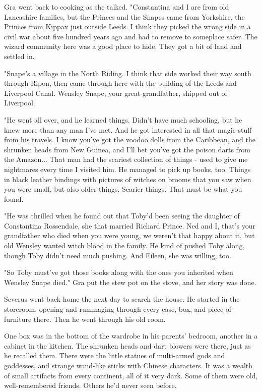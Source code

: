 \documentclass[a4paper,11pt]{article}
\begin{document}
Gra went back to cooking as she talked. "Constantina and I are from old Lancashire families, but the Princes and the Snapes came from Yorkshire, the Princes from Kippax just outside Leeds. I think they picked the wrong side in a civil war about five hundred years ago and had to remove to someplace safer. The wizard community here was a good place to hide. They got a bit of land and settled in.

"Snape's a village in the North Riding. I think that side worked their way south through Ripon, then came through here with the building of the Leeds and Liverpool Canal. Wensley Snape, your great-grandfather, shipped out of Liverpool.

"He went all over, and he learned things. Didn't have much schooling, but he knew more than any man I've met. And he got interested in all that magic stuff from his travels. I know you've got the voodoo dolls from the Caribbean, and the shrunken heads from New Guinea, and I'll bet you've got the poison darts from the Amazon... That man had the scariest collection of things - used to give me nightmares every time I visited him. He managed to pick up books, too. Things in black leather bindings with pictures of witches on brooms that you saw when you were small, but also older things. Scarier things. That must be what you found.

"He was thrilled when he found out that Toby'd been seeing the daughter of Constantina Rossendale, she that married Richard Prince. Ned and I, that's your grandfather who died when you were young, we weren't that happy about it, but old Wensley wanted witch blood in the family. He kind of pushed Toby along, though Toby didn't need much pushing. And Eileen, she was willing, too.

"So Toby must've got those books along with the ones you inherited when Wensley Snape died." Gra put the stew pot on the stove, and her story was done.

Severus went back home the next day to search the house. He started in the storeroom, opening and rummaging through every case, box, and piece of furniture there. Then he went through his old room.

One box was in the bottom of the wardrobe in his parents' bedroom, another in a cabinet in the kitchen. The shrunken heads and dart blowers were there, just as he recalled them. There were the little statues of multi-armed gods and goddesses, and strange wand-like sticks with Chinese characters. It was a wealth of small artifacts from every continent, all of it very dark. Some of them were old, well-remembered friends. Others he'd never seen before.
\end{document}
